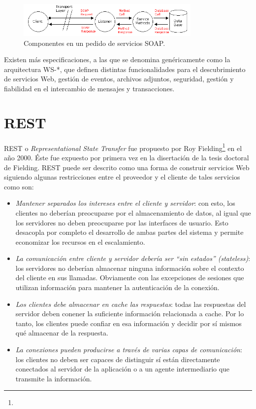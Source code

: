 \documentclass[conference]{IEEEtran}
\begin{document}
\begin{figure}[!t]
\centering
  \includegraphics[width=0.8\textwidth]{img/soap-comp}
  \caption{Componentes en un pedido de servicios SOAP.}
  \label{fig:soap-comp}
\end{figure}

Existen más especificaciones, a las que se denomina genéricamente como
la arquitectura WS-*, que definen distintas funcionalidades para el
descubrimiento de servicios Web, gestión de eventos, archivos
adjuntos, seguridad, gestión y fiabilidad en el intercambio de
mensajes y transacciones. 

\section{REST}
\label{sec:soap}

REST o \textsl{Representational State Transfer} fue propuesto por Roy
Fielding\footnote{} en el
año 2000. Éste fue expuesto por primera vez en la disertación
de la tesis doctoral de Fielding. REST
puede ser descrito como una forma de construir servicios Web siguiendo
algunas restricciones entre el proveedor y el cliente de tales
servicios como son\cite{NordicAPIs}:

\begin{itemize}
\item \emph{Mantener separados los intereses entre el cliente y
    servidor}: con esto, los clientes no deberían preocuparse por el
  almacenamiento de datos, al igual que los servidores no deben
  preocuparse por las interfaces de usuario. Esto desacopla por completo
  el desarrollo de ambas partes del sistema y permite economizar los
  recursos en el escalamiento.
\item \emph{La comunicación entre cliente y servidor debería ser ``sin
    estados'' (stateless)}: los servidores no deberían almacenar ninguna
  información sobre el contexto del cliente en sus llamadas. Obviamente
  con las excepciones de sesiones que utilizan información para mantener
  la autenticación de la conexión.
\item \emph{Los clientes debe almacenar en cache las respuestas}:
  todas las respuestas del servidor deben conener la suficiente
  información relacionada a cache. Por lo tanto, los clientes puede
  confiar en esa información y decidir por sí mismos qué almacenar de la
  respuesta.
\item \emph{La conexiones pueden producirse a través de varias capas
    de comunicación}: los clientes no deben ser capaces de distinguir sí
  están directamente conectados al servidor de la aplicación o a un
  agente intermediario que transmite la información.
\end{itemize}
\end{document}
